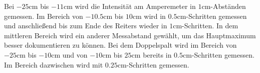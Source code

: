 \noindent Bei $-25 \unit{\centi\meter}$ bis $-11 \unit{\centi\meter}$ wird die 
Intensität am Amperemeter in $1 \unit{\centi\meter}$-Abständen gemessen.
Im Bereich von $-10.5 \unit{\centi\meter}$ bis $10 \unit{\centi\meter}$ wird
in $0.5 \unit{\centi\meter}$-Schritten gemessen und anschließend bis zum Ende 
des Reiters wieder in $1 \unit{\centi\meter}$-Schritten. In dem mittleren Bereich 
wird ein anderer Messabstand gewählt, um das Hauptmaximum besser dokumentieren 
zu können. Bei dem Doppelspalt wird im Bereich von $-25 \unit{\centi\meter}$
bis $-10 \unit{\centi\meter}$ und von $-10 \unit{\centi\meter}$ bis 
$25 \unit{\centi\meter}$ bereits in $0.5 \unit{\centi\meter}$-Schritten gemessen.
Im Bereich dazwischen wird mit $0.25 \unit{\centi\meter}$-Schritten gemessen.
